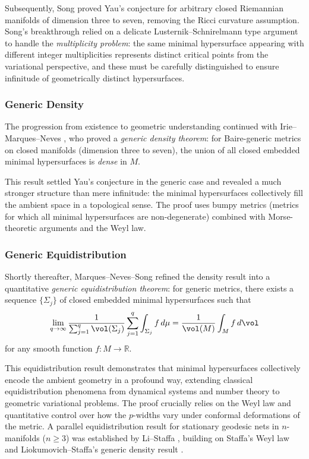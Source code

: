 Subsequently, Song \cite{Song18} proved Yau's conjecture for arbitrary closed Riemannian manifolds
of dimension three to seven, removing the Ricci curvature assumption. Song's breakthrough relied on
a delicate Lusternik--Schnirelmann type argument to handle the \emph{multiplicity problem}: the
same minimal hypersurface appearing with different integer multiplicities represents distinct
critical points from the variational perspective, and these must be carefully distinguished to
ensure infinitude of geometrically distinct hypersurfaces.

\subsubsection{Generic Density}

The progression from existence to geometric understanding continued with Irie--Marques--Neves
\cite{IMN17}, who proved a \emph{generic density theorem}: for Baire-generic metrics on closed
manifolds (dimension three to seven), the union of all closed embedded minimal hypersurfaces is
\emph{dense} in $M$.

This result settled Yau's conjecture in the generic case and revealed a much stronger structure
than mere infinitude: the minimal hypersurfaces collectively fill the ambient space in a
topological sense. The proof uses bumpy metrics (metrics for which all minimal hypersurfaces are
non-degenerate) combined with Morse-theoretic arguments and the Weyl law.

\subsubsection{Generic Equidistribution}

Shortly thereafter, Marques--Neves--Song \cite{MNS} refined the density result into a quantitative
\emph{generic equidistribution theorem}: for generic metrics, there exists a sequence
$\{\Sigma_j\}$ of closed embedded minimal hypersurfaces such that
\[
    \lim_{q \to \infty} \frac{1}{\sum_{j=1}^q \vol(\Sigma_j)} \sum_{j=1}^q \int_{\Sigma_j} f \, d\mu
    = \frac{1}{\vol(M)} \int_M f \, d\vol
\]
for any smooth function $f: M \to \mathbb{R}$.

This equidistribution result demonstrates that minimal hypersurfaces collectively encode the
ambient geometry in a profound way, extending classical equidistribution phenomena from dynamical
systems and number theory to geometric variational problems. The proof crucially relies on the
Weyl law and quantitative control over how the $p$-widths vary under conformal deformations of the
metric. A parallel equidistribution result for stationary geodesic nets in $n$-manifolds ($n \geq 3$)
was established by Li--Staffa \cite{LS23}, building on Staffa's Weyl law and Liokumovich--Staffa's
generic density result \cite{LioStaffa-dense}.

